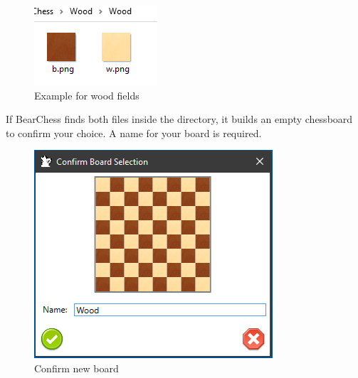 \documentclass[11pt,a4paper]{article}
\begin{document}
\begin{figure}[H]
	\centering
	\includegraphics[scale=1.0]{WoodPieces.png}
	\caption{Example for wood fields }
	\label{fig:WoodPieces}
\end{figure}

If BearChess finds both files inside the directory, it builds an empty chessboard to confirm your choice. A name for your board is required.

\begin{figure}[H]
	\centering
	\includegraphics[scale=1.0]{ConfirmBoard.png}
	\caption{Confirm new board }
	\label{fig:ConfirmBoard}
\end{figure}
\end{document}
